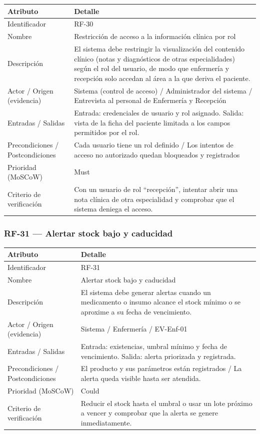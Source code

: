 \documentclass[11pt,a4paper]{article}
\begin{document}
	\begin{longtable}{p{} p{}}
		
		\toprule
		\textbf{Atributo} & \textbf{Detalle} \\
		\midrule
		\endhead
		
		Identificador & RF-30 \\
		Nombre & Restricción de acceso a la información clínica por rol \\
		Descripción & El sistema debe restringir la visualización del contenido clínico (notas y diagnósticos de otras especialidades) según el rol del usuario, de modo que enfermería y recepción solo accedan al área a la que deriva el paciente. \\
		Actor / Origen (evidencia) & Sistema (control de acceso) / Administrador del sistema / Entrevista al personal de Enfermería y Recepción \\
		Entradas / Salidas & Entrada: credenciales de usuario y rol asignado. Salida: vista de la ficha del paciente limitada a los campos permitidos por el rol. \\
		Precondiciones / Postcondiciones & Cada usuario tiene un rol definido / Los intentos de acceso no autorizado quedan bloqueados y registrados \\
		Prioridad (MoSCoW) & Must \\
		Criterio de verificación & Con un usuario de rol ``recepción'', intentar abrir una nota clínica de otra especialidad y comprobar que el sistema deniega el acceso. \\
		\bottomrule
	\end{longtable}
	
	
	
	\subsubsection{RF-31 --- Alertar stock bajo y caducidad}
	\begin{longtable}{p{} p{}}
		\toprule
		\textbf{Atributo} & \textbf{Detalle} \\
		\midrule
		\endhead
		Identificador & RF-31 \\
		Nombre & Alertar stock bajo y caducidad \\
		Descripción & El sistema debe generar alertas cuando un medicamento o insumo alcance el stock mínimo o se aproxime a su fecha de vencimiento. \\
		Actor / Origen (evidencia) & Sistema / Enfermería / EV-Enf-01 \\
		Entradas / Salidas & Entrada: existencias, umbral mínimo y fecha de vencimiento. Salida: alerta priorizada y registrada. \\
		Precondiciones / Postcondiciones & El producto y sus parámetros están registrados / La alerta queda visible hasta ser atendida. \\
		Prioridad (MoSCoW) & Could \\
		Criterio de verificación & Reducir el stock hasta el umbral o usar un lote próximo a vencer y comprobar que la alerta se genere inmediatamente. \\
		\bottomrule
	\end{longtable}
	
\end{document}
